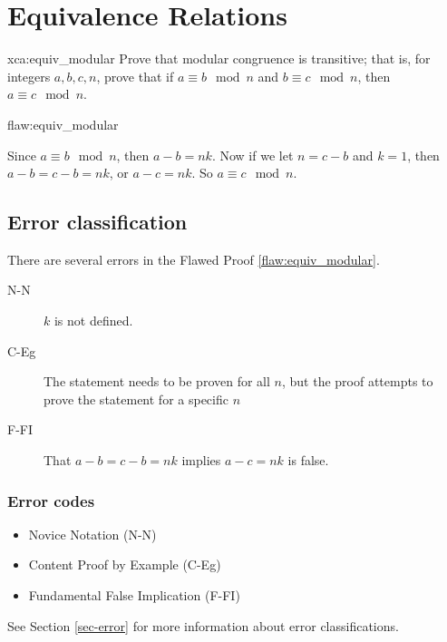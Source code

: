 \section{Equivalence Relations}

\begin{xca}{xca:equiv_modular}
Prove that modular congruence is transitive; that is, for integers $a,b,c,n$, prove that if $a \equiv b \mod n$ and $b \equiv c \mod n$, then $a \equiv c \mod n$. 

\end{xca}

\begin{flaw}{flaw:equiv_modular} %

Since $a \equiv b \mod n$, then $a - b = nk$. Now if we let $n = c-b$ and $k=1$, then $a-b = c-b = nk$, or $a-c = nk$. So $a\equiv c \mod n$. 
\end{flaw}

\clearpage
\subsection{Error classification}


There are several errors
 in the Flawed Proof \ref{flaw:equiv_modular}. 
 
 \begin{description}
    \item[N-N] $k$ is not defined. 
    \item[C-Eg] The statement needs to be proven for all $n$, but the proof attempts to prove the statement for a specific $n$
    \item[F-FI] That $a-b = c-b = nk$ implies $a-c = nk$ is false. 

 	
 \end{description}

 
\subsubsection{Error codes}
\begin{itemize}
    \item Novice Notation (N-N)
	\item Content Proof by Example (C-Eg)
	\item Fundamental False Implication (F-FI)
\end{itemize}
See Section \ref{sec-error} for more information about error classifications.


